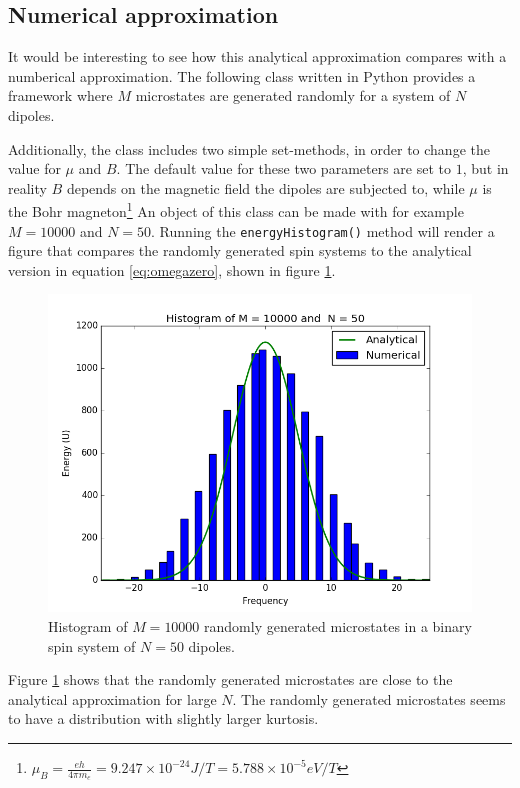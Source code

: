 \documentclass[10pt,a4paper]{amsart}
\begin{document}
\subsection{Numerical approximation}

It would be interesting to see how this analytical approximation compares with a numberical approximation. The following class written in Python provides a framework where $M$ microstates are generated randomly for a system of $N$ dipoles. 



Additionally, the class includes two simple set-methods, in order to change the value for $\mu$ and $B$. The default value for these two parameters are set to $1$, but in reality $B$ depends on the magnetic field the dipoles are subjected to, while $\mu$ is the Bohr magneton\footnote{$\mu_B=\frac{eh}{4\pi m_e}=9.247\times 10^{-24} J/T =5.788\times 10^{-5} eV/T$} An object of this class can be made with for example $M=10000$ and $N=50$. Running the \lstinline$energyHistogram()$ method will render a figure that compares the randomly generated spin systems to the analytical version in equation \ref{eq:omegazero}, shown in figure \ref{fig:randomspin}.

\begin{figure}[h]
  \centering
  \includegraphics[width=0.9\linewidth]{figures/RandomSpinM10000N50.png}
  \caption{Histogram of $M=10000$ randomly generated microstates in a binary spin system of $N=50$ dipoles.}
  \label{fig:randomspin}
\end{figure}

Figure \ref{fig:randomspin} shows that the randomly generated microstates are close to the analytical approximation for large $N$. The randomly generated microstates seems to have a distribution with slightly larger kurtosis.
\end{document}
